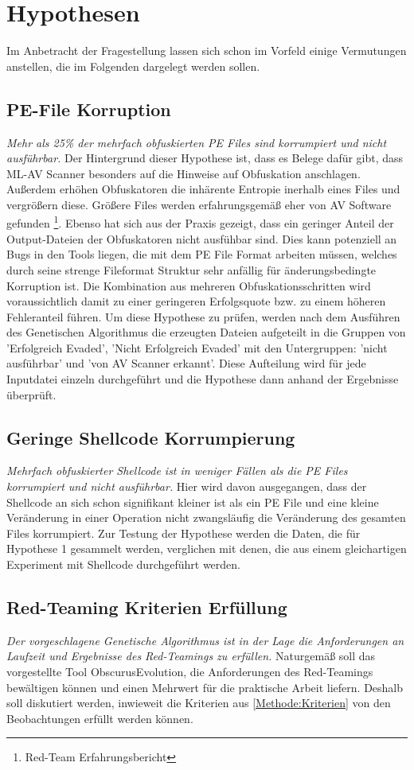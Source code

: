 
\section{Hypothesen}
\label{Sec:Hypothesen}
Im Anbetracht der Fragestellung lassen sich schon im Vorfeld einige Vermutungen anstellen, die im Folgenden dargelegt werden sollen.
\subsection{PE-File Korruption} 
\textit{Mehr als 25\% der mehrfach obfuskierten PE Files sind korrumpiert und nicht ausführbar.} 
Der Hintergrund dieser Hypothese ist, dass es Belege dafür gibt, dass ML-AV Scanner besonders auf die Hinweise auf Obfuskation anschlagen\cite{nunes_2022_bane}. Außerdem erhöhen Obfuskatoren die inhärente Entropie inerhalb eines Files und vergrößern diese. Größere Files werden erfahrungsgemäß eher von AV Software gefunden \footnote{Red-Team Erfahrungsbericht}. Ebenso hat sich aus der Praxis gezeigt, dass ein geringer Anteil der Output-Dateien der Obfuskatoren nicht ausfühbar sind.
Dies kann potenziell an Bugs in den Tools liegen, die mit dem PE File Format arbeiten müssen, welches durch seine strenge Fileformat Struktur sehr anfällig für änderungsbedingte Korruption ist. Die Kombination aus mehreren Obfuskationsschritten wird voraussichtlich damit zu einer geringeren Erfolgsquote bzw. zu einem höheren Fehleranteil führen.
Um diese Hypothese zu prüfen, werden nach dem Ausführen des Genetischen Algorithmus die erzeugten Dateien aufgeteilt in die Gruppen von 'Erfolgreich Evaded', 'Nicht Erfolgreich Evaded' mit den Untergruppen: 'nicht ausführbar' und 'von AV Scanner erkannt'. Diese Aufteilung wird für jede Inputdatei einzeln durchgeführt und die Hypothese dann anhand der Ergebnisse überprüft.
\subsection{Geringe Shellcode Korrumpierung}
\textit{Mehrfach obfuskierter Shellcode ist in weniger Fällen als die PE Files korrumpiert und nicht ausführbar.}
Hier wird davon ausgegangen, dass der Shellcode an sich schon signifikant kleiner ist als ein PE File und eine kleine Veränderung in einer Operation nicht zwangsläufig die Veränderung des gesamten Files korrumpiert. Zur Testung der Hypothese werden die Daten, die für Hypothese 1 gesammelt werden, verglichen mit denen, die aus einem gleichartigen Experiment mit Shellcode durchgeführt werden.
\subsection{Red-Teaming Kriterien Erfüllung}
\textit{Der vorgeschlagene Genetische Algorithmus ist in der Lage die Anforderungen an Laufzeit und Ergebnisse des Red-Teamings zu erfüllen.}
Naturgemäß soll das vorgestellte Tool ObscurusEvolution, die Anforderungen des Red-Teamings bewältigen können und einen Mehrwert für die praktische Arbeit liefern. Deshalb soll diskutiert werden, inwieweit die Kriterien aus \ref{Methode:Kriterien} von den Beobachtungen erfüllt werden können.
